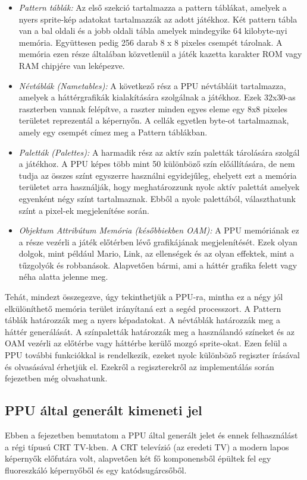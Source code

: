 \begin{itemize}
	\item \emph{Pattern táblák:} Az első szekció tartalmazza a pattern táblákat, amelyek a nyers sprite-kép adatokat tartalmazzák az adott játékhoz. Két pattern tábla van a bal oldali és a jobb oldali tábla amelyek mindegyike 64 kilobyte-nyi memória. Együttesen pedig 256 darab 8 x 8 pixeles csempét tárolnak. A memória ezen része általában közvetlenül 
	a játék kazetta karakter ROM vagy RAM chipjére van leképezve.
	\item \emph{Névtáblák (Nametables):} A következő rész a PPU névtábláit tartalmazza, amelyek a háttérgrafikák kialakítására szolgálnak a játékhoz. Ezek 32x30-as raszterben vannak felépítve, a raszter minden egyes eleme egy 8x8 pixeles területet reprezentál a képernyőn. A cellák egyetlen byte-ot tartalmaznak, amely egy csempét címez meg a Pattern táblákban.  
	\item \emph{Paletták (Palettes):} A harmadik rész az aktív szín paletták tárolására szolgál a játékhoz. A PPU képes több mint 50 különböző szín előállítására, de nem tudja az összes színt egyszerre használni egyidejűleg, ehelyett ezt a memória területet arra használják, hogy meghatározzunk nyolc aktív palettát amelyek egyenként négy színt tartalmaznak. Ebből a nyolc palettából, választhatunk színt a pixel-ek megjelenítése során.
	\item \emph{Objektum Attribútum Memória (későbbiekben OAM):} A PPU memóriának ez a része vezérli a játék előtérben lévő grafikájának megjelenítését. Ezek olyan dolgok, mint például Mario, Link, az ellenségek és az olyan effektek, mint a tűzgolyók és robbanások. Alapvetően bármi, ami a háttér grafika felett vagy néha alatta jelenne meg.
\end{itemize}

Tehát, mindezt összegezve, úgy tekinthetjük a PPU-ra, mintha ez a négy jól elkülöníthető memória terület irányítaná ezt a segéd processzort. A Pattern táblák határozzák meg a nyers képadatokat. A névtáblák határozzák meg a háttér generálását. A színpaletták határozzák meg a használandó színeket és az OAM vezérli az előtérbe vagy háttérbe kerülő mozgó sprite-okat.
Ezen felül a PPU további funkciókkal is rendelkezik, ezeket nyolc különböző regiszter írásával és olvasásával érhetjük el. Ezekről a regiszterekről az implementálás során  fejezetben még olvashatunk.

	\subsection{PPU által generált kimeneti jel}
	\label{subsec:PPU-CRT}
	Ebben a fejezetben bemutatom a PPU által generált jelet és ennek felhasználást a régi típusú CRT TV-kben. A CRT televízió (az eredeti TV) a modern lapos képernyők előfutára volt, alapvetően két fő komponensből épültek fel egy fluoreszkáló képernyőből és egy katódsugárcsőből. 
	
